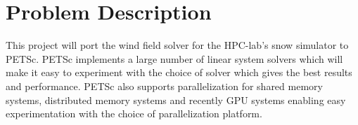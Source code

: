 \section*{Problem Description}

This project will port the wind field solver for the HPC-lab's snow simulator to 
PETSc. PETSc implements a large number of linear system solvers which will make 
it easy to experiment with the choice of solver which gives the best results and 
performance. PETSc also supports parallelization for shared memory systems, 
distributed memory systems and recently GPU systems enabling easy experimentation 
with the choice of parallelization platform. 
